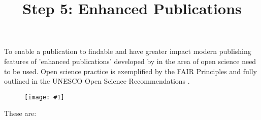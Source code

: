 \documentclass{article}
\newlength{\imgwidth}
\newcommand\scaledgraphics[2]{%
                
\settowidth{\imgwidth}{\texttt{[image: \#1]}}%
                
\setlength{\imgwidth}{\minof{\imgwidth}{#2\textwidth}}%
                
\texttt{[image: \#1]}%
                
}
\begin{document}
\title{Step 5: Enhanced Publications}

\maketitle


To enable a publication to findable and have greater impact modern publishing features of 'enhanced publications' developed by in the area of open science need to be used. Open science practice is exemplified by the FAIR Principles \autocite{GOFAIR2016} and fully outlined in the UNESCO Open Science Recommendations \autocite{UNESCO2021}.

\begin{figure}
\scaledgraphics{1f9fd912-8fb6-4e4e-9ecb-e91220e21b85.png}{0.5}
\label{F3240941}
\end{figure}


These are:
\end{document}
